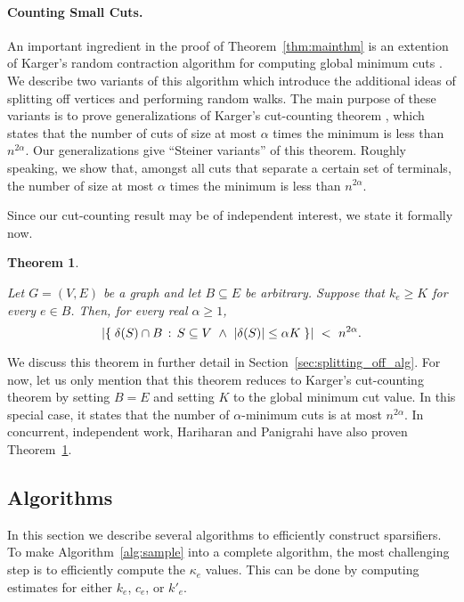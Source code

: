 \documentclass[11pt]{article}
\numberwithin{equation}{section}
\newtheorem{theorem}{Theorem}[section]
\newcommand{\intersect}{\cap}
\newcommand{\abs}[1]{\lvert #1 \rvert}
\newcommand{\card}[1]{\abs{#1}}
\newcommand{\Algorithm}[1]{Algorithm~\ref{alg:#1}}
\newcommand{\Section}[1]{Section~\ref{sec:#1}}
\newcommand{\TheoremName}[1]{\label{thm:#1}}
\newcommand{\Theorem}[1]{Theorem~\ref{thm:#1}}
\begin{document}
\paragraph{Counting Small Cuts.}
An important ingredient in the proof of \Theorem{mainthm}
is an extention of Karger's random contraction algorithm
for computing global minimum cuts \cite{KargerContract,KargerStein}.
We describe two variants of this algorithm which introduce the additional ideas 
of splitting off vertices and performing random walks.
The main purpose of these variants is to prove generalizations of Karger's cut-counting
theorem \cite{KargerContract,KargerStein},
which states that the number of cuts of size at most $\alpha$ times the
minimum is less than $n^{2 \alpha}$.
Our generalizations give ``Steiner variants'' of this theorem.
Roughly speaking, we show that, amongst all cuts that separate a certain set of terminals,
the number of size at most $\alpha$ times the minimum is less than $n^{2\alpha}$.

Since our cut-counting result may be of independent interest,
we state it formally now.

\newcommand{\thmcountcutclass}{
    Let $G=(V,E)$ be a graph and let $B \subseteq E$ be arbitrary.
    Suppose that $k_e \geq K$ for every $e \in B$.
    Then, for every real $\alpha \geq 1$,
    $$
    \card{ \setst{ \delta(S) \intersect B }{ S \subseteq V ~\wedge~ \card{\delta(S)} \leq \alpha K } }
    ~<~ n^{2\alpha}.
    $$}
\begin{theorem}
\TheoremName{count_cut_class}
\thmcountcutclass
\end{theorem}

We discuss this theorem in further detail in \Section{splitting_off_alg}.
For now, let us only mention that this theorem reduces to
Karger's cut-counting theorem
by setting $B=E$ and setting $K$ to the global minimum cut value.
In this special case, it states that
the number of $\alpha$-minimum cuts is at most $n^{2\alpha}$.
In concurrent, independent work, Hariharan and Panigrahi \cite{HP}
have also proven \Theorem{count_cut_class}.


\subsection{Algorithms}

In this section we describe several algorithms to efficiently construct sparsifiers.
To make \Algorithm{sample} into a complete algorithm,
the most challenging step is to efficiently compute the $\kappa_e$ values.
This can be done by computing estimates for either $k_e$, $c_e$, or $k'_e$.
\end{document}
